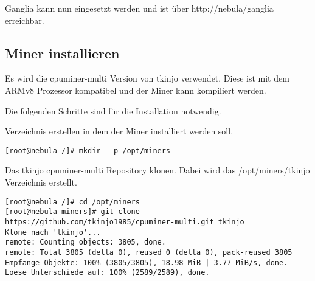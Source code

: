 Ganglia kann nun eingesetzt werden und ist über http://nebula/ganglia erreichbar.

\subsection{Miner installieren}
Es wird die cpuminer-multi Version von tkinjo verwendet. Diese ist mit dem ARMv8 Prozessor kompatibel und der Miner kann kompiliert werden.

Die folgenden Schritte sind für die Installation notwendig.

Verzeichnis erstellen in dem der Miner installiert werden soll.
\begin{lstlisting}
[root@nebula /]# mkdir  -p /opt/miners
\end{lstlisting}

Das tkinjo cpuminer-multi Repository klonen. Dabei wird das /opt/miners/tkinjo Verzeichnis erstellt.
\begin{lstlisting}
[root@nebula /]# cd /opt/miners
[root@nebula miners]# git clone https://github.com/tkinjo1985/cpuminer-multi.git tkinjo
Klone nach 'tkinjo'...
remote: Counting objects: 3805, done.
remote: Total 3805 (delta 0), reused 0 (delta 0), pack-reused 3805
Empfange Objekte: 100% (3805/3805), 18.98 MiB | 3.77 MiB/s, done.
Loese Unterschiede auf: 100% (2589/2589), done.
\end{lstlisting}

